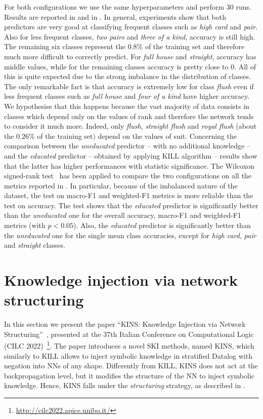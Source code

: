 %
For both configurations we use the same hyperparameters and perform $30$ runs.
%
Results are reported in  and in .
%
In general, experiments show that both predictors are very good at classifying frequent classes such as \emph{high card} and \emph{pair}.
%
Also for less frequent classes, \emph{two pairs} and \emph{three of a kind}, accuracy is still high.
%
The remaining six classes represent the $0.8\%$ of the training set and therefore much more difficult to correctly predict.
%
For \emph{full house} and \emph{straight}, accuracy has middle values, while for the remaining classes accuracy is pretty close to $0$.
%
All of this is quite expected due to the strong imbalance in the distribution of classes.
%
The only remarkable fact is that accuracy is extremely low for class \emph{flush} even if less frequent classes such as \emph{full house} and \emph{four of a kind} have higher accuracy.
%
We hypothesise that this happens because the vast majority of data consists in classes which depend only on the values of rank and therefore the network tends to consider it much more.
%
Indeed, only \emph{flush}, \emph{straight flush} and \emph{royal flush} (about the $0.26\%$ of the training set) depend on the values of suit.
%
Concerning the comparison between the \emph{uneducated} predictor -- with no additional knowledge -- and the \emph{educated} predictor -- obtained by applying KILL algorithm -- results show that the latter has higher performances with statistic significance.
%
The Wilcoxon signed-rank test~\cite{wilcoxon1945} has been applied to compare the two configurations on all the metrics reported in .
%
In particular, because of the imbalanced nature of the dataset, the test on macro-F1 and weighted-F1 metrics is more reliable than the test on accuracy.
%
The test shows that the \emph{educated} predictor is significantly better than the \emph{uneducated} one for the overall accuracy, macro-F1 and weighted-F1 metrics (with $p < 0.05$).
%
Also, the \emph{educated} predictor is significantly better than the \emph{uneducated} one for the single mean class accuracies, except for \emph{high card}, \emph{pair} and \emph{straight} classes.


\section{Knowledge injection via network structuring}\label{sec:ski-contribution-kins}
%
In this section we present the paper ``KINS: Knowledge Injection via Network Structuring''~\cite{DBLP:conf/cilc/MagniniCO22}, presented at the 37th Italian Conference on Computational Logic (CILC 2022)~\footnote{\url{http://cilc2022.apice.unibo.it/}}.
%
The paper introduces a novel \gls{SKI} methods, named \gls{KINS}, which similarly to \gls{KILL} allows to inject symbolic knowledge in stratified Datalog with negation into \glspl{NN} of any shape.
%
Differently from \gls{KILL}, \gls{KINS} does not act at the backpropagation level, but it modifies the structure of the \gls{NN} to inject symbolic knowledge.
%
Hence, \gls{KINS} falls under the \emph{structuring} strategy, as described in .


